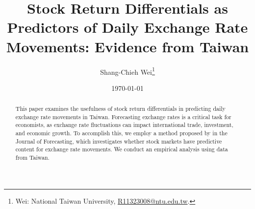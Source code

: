 \documentclass[]{AEA}
\begin{document}
\title{Stock Return Differentials as Predictors of Daily Exchange Rate
Movements: Evidence from Taiwan}


\author{
  Shang-Chieh Wei\thanks{
  Wei: National Taiwan
University, \href{mailto:R11323008@ntu.edu.tw}{R11323008@ntu.edu.tw}.
}
}

\date{\today}
\JEL{}

\begin{abstract}
This paper examines the usefulness of stock return differentials in
predicting daily exchange rate movements in Taiwan. Forecasting exchange
rates is a critical task for economists, as exchange rate fluctuations
can impact international trade, investment, and economic growth. To
accomplish this, we employ a method proposed by \cite{chen2019stock} in
the Journal of Forecasting, which investigates whether stock markets
have predictive content for exchange rate movements. We conduct an
empirical analysis using data from Taiwan.
\end{abstract}


\maketitle

\newpage
\thispagestyle{empty}

\mbox{}
\end{document}
